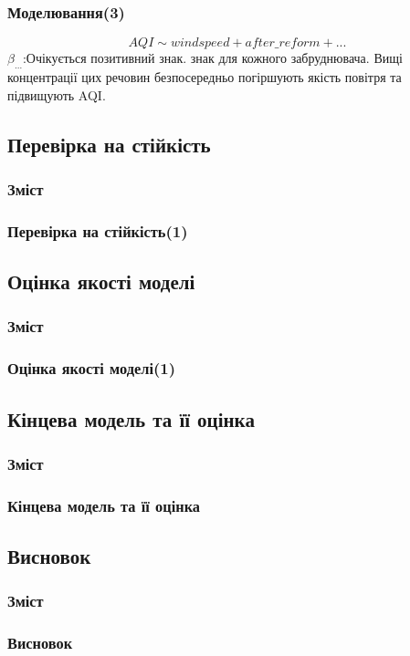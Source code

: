 ﻿\documentclass{beamer}
\begin{document}
\begin{frame}
  \frametitle{Моделювання(3)}
   $$AQI \sim windspeed + after\_reform + ... $$
   $\beta_{...}$:Очікується позитивний знак. 
   знак для кожного забруднювача. Вищі концентрації цих речовин 
   безпосередньо погіршують якість повітря та підвищують AQI.
\end{frame}

\begin{frame}
  \subsection{Перевірка на стійкість}

  \frametitle{Зміст}
  \tableofcontents[currentsection]
\end{frame}

\begin{frame}
  \frametitle{Перевірка на стійкість(1)}
   
\end{frame}

\begin{frame}
  \subsection{Оцінка якості моделі}

  \frametitle{Зміст}
  \tableofcontents[currentsection]
\end{frame}

\begin{frame}
  \frametitle{Оцінка якості моделі(1)}
   
\end{frame}

\begin{frame}
  \section{Кінцева модель та її оцінка}

  \frametitle{Зміст}
  \tableofcontents[currentsection]
\end{frame}

\begin{frame}
  \frametitle{Кінцева модель та її оцінка}
   
\end{frame}

\begin{frame}
  \section{Висновок}

  \frametitle{Зміст}
  \tableofcontents[currentsection]
\end{frame}

\begin{frame}
  \frametitle{Висновок}
   
\end{frame}
\end{document}
